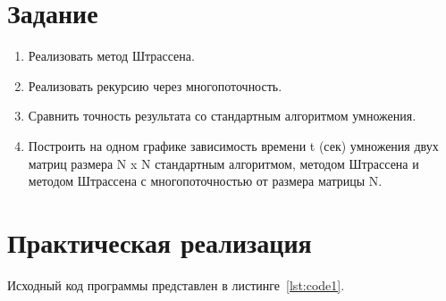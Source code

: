 \documentclass[a4paper, 14pt]{extarticle}
\begin{document}
\renewcommand{\ttdefault}{pcr}

\setlength{\tabcolsep}{3pt}
\newpage
\setcounter{page}{2}

\section{Задание}\label{Sect::task}

\begin{enumerate}
    \item Реализовать метод Штрассена.
    \item Реализовать рекурсию через многопоточность.
    \item Сравнить точность результата со стандартным алгоритмом умножения.
    \item Построить на одном графике зависимость времени t (сек) умножения двух матриц размера N x N стандартным алгоритмом, методом Штрассена и методом Штрассена с многопоточностью от размера матрицы N.
\end{enumerate}

\section{Практическая реализация}\label{Sect::code}

Исходный код программы представлен в листинге~\ref{lst:code1}. 
\end{document}
